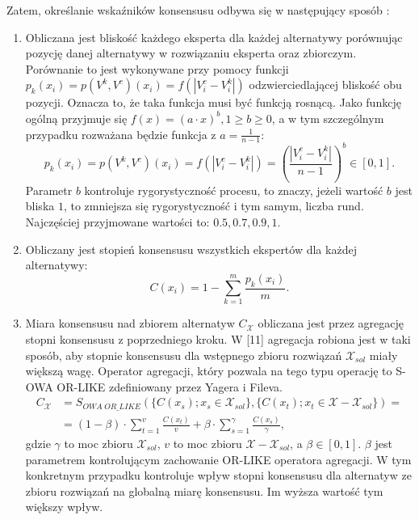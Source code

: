 Zatem, określanie wskaźników konsensusu odbywa się w następujący sposób
\cite{Herrera-Viedma2002}:
\begin{enumerate}
  \item Obliczana jest bliskość każdego eksperta dla każdej alternatywy
  porównując pozycję danej alternatywy w rozwiązaniu eksperta oraz zbiorczym.
  Porównanie to jest wykonywane przy pomocy funkcji $p_k(x_i) = p(V^k,V^c)(x_i)
  = f(|V^c_i - V^k_i|)$ odzwierciedlającej bliskość obu pozycji. Oznacza to, że
  taka funkcja musi być funkcją rosnącą. Jako funkcję ogólną przyjmuje się
  $f(x) = (a \cdot x)^b, 1 \geq b \geq 0$, a w tym szczególnym przypadku
  rozważana będzie funkcja z $a = \frac{1}{n-1}$:
  \begin{equation}
  p_k(x_i) = p(V^k,V^c)(x_i) = f(|V^c_i - V^k_i|) = (\frac{|V^c_i -
  V^k_i|}{n-1})^b \in [0,1].
  \end{equation}
  Parametr $b$ kontroluje rygorystyczność procesu, to znaczy, jeżeli wartość $b$
  jest bliska $1$, to zmniejsza się rygorystyczność i tym samym, liczba rund.
  Najczęściej przyjmowane wartości to: $0.5, 0.7, 0.9, 1$.
  
  \item Obliczany jest stopień konsensusu wszystkich ekspertów dla każdej
  alternatywy:
  \begin{equation}
  C(x_i) = 1 - \sum_{k=1}^{m} \frac{p_k(x_i)}{m}.
  \end{equation}
  
  \item Miara konsensusu nad zbiorem alternatyw $C_{\mathcal{X}}$ obliczana jest
  przez agregację stopni konsensusu z poprzedniego kroku. W [11] agregacja
  robiona jest w taki sposób, aby stopnie konsensusu dla wstępnego zbioru
  rozwiązań $\mathcal{X}_{sol}$ miały większą wagę. Operator agregacji, który
  pozwala na tego typu operację to S-OWA OR-LIKE zdefiniowany przez Yagera i
  Fileva.
  \begin{equation}
  \begin{split}
  C_{\mathcal{X}} &= S_{OWA \; OR\_LIKE}(\{ C(x_s); x_s \in
  \mathcal{X}_{sol}\}, \{ C(x_t); x_t \in \mathcal{X} - \mathcal{X}_{sol} \}) =
  \\ 
  &= (1 - \beta)\cdot \sum_{t=1}^{v} \frac{C(x_t)}{v} + \beta \cdot
  \sum_{s=1}^{\gamma} \frac{C(x_s)}{\gamma},
  \end{split}
  \end{equation}
  gdzie $\gamma$ to moc zbioru $\mathcal{X}_{sol}$, $v$ to moc zbioru
  $\mathcal{X} - \mathcal{X}_{sol}$, a $\beta \in [0,1].$ $\beta$ jest
  parametrem kontrolującym zachowanie OR-LIKE operatora agregacji. W tym
  konkretnym przypadku kontroluje wpływ stopni konsensusu dla alternatyw ze
  zbioru rozwiązań na globalną miarę konsensusu. Im wyższa wartość tym większy
  wpływ.
  

\end{enumerate}
